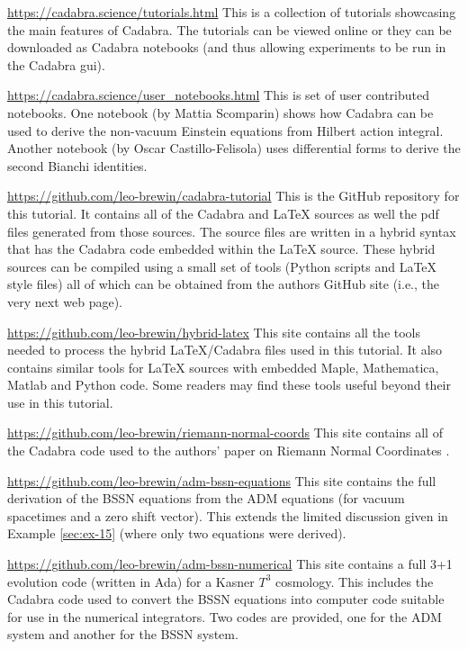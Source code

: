 \documentclass[a4paper,12pt]{article}
\numberwithin{equation}{section}%
\begin{document}
\url{https://cadabra.science/tutorials.html}\Break
This is a collection of tutorials showcasing the main features of Cadabra. The tutorials can
be viewed online or they can be downloaded as Cadabra notebooks (and thus allowing
experiments to be run in the Cadabra gui).

\url{https://cadabra.science/user_notebooks.html}\Break
This is set of user contributed notebooks. One notebook (by Mattia Scomparin) shows how
Cadabra can be used to derive the non-vacuum Einstein equations from Hilbert action
integral. Another notebook (by Oscar Castillo-Felisola) uses differential forms to derive
the second Bianchi identities.

\url{https://github.com/leo-brewin/cadabra-tutorial}\Break
This is the GitHub repository for this tutorial. It contains all of the Cadabra and LaTeX
sources as well the pdf files generated from those sources. The source files are written in
a hybrid syntax that has the Cadabra code embedded within the LaTeX source. These hybrid
sources can be compiled using a small set of tools (Python scripts and LaTeX style files)
all of which can be obtained from the authors GitHub site (i.e., the very next web page).

\url{https://github.com/leo-brewin/hybrid-latex}\Break
This site contains all the tools needed to process the hybrid LaTeX/Cadabra files used
in this tutorial. It also contains similar tools for LaTeX sources with embedded Maple,
Mathematica, Matlab and Python code. Some readers may find these tools useful beyond their
use in this tutorial.

\url{https://github.com/leo-brewin/riemann-normal-coords}\Break
This site contains all of the Cadabra code used to the authors' paper on Riemann Normal
Coordinates \cite{brewin:2009-02}.

\url{https://github.com/leo-brewin/adm-bssn-equations}\Break
This site contains the full derivation of the BSSN equations from the ADM equations (for
vacuum spacetimes and a zero shift vector). This extends the limited discussion given
in Example \ref{sec:ex-15} (where only two equations were derived).

\url{https://github.com/leo-brewin/adm-bssn-numerical}\Break
This site contains a full 3+1 evolution code (written in Ada) for a Kasner $T^3$ cosmology.
This includes the Cadabra code used to convert the BSSN equations into computer code
suitable for use in the numerical integrators. Two codes are provided, one for the ADM
system and another for the BSSN system.
\end{document}
